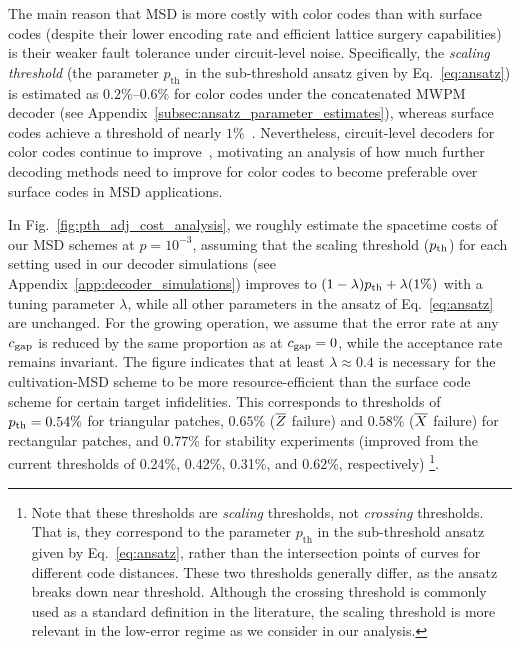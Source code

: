 \documentclass[
 prx,
 reprint,
 superscriptaddress,
 longbibliography,
 dvipsnames
]{revtex4-2}
\begin{document}
\label{para:themainreason}
The main reason that MSD is more costly with color codes than with surface codes (despite their lower encoding rate and efficient lattice surgery capabilities) is their weaker fault tolerance under circuit-level noise. 
Specifically, the \textit{scaling threshold} (the parameter $p_\mathrm{th}$ in the sub-threshold ansatz given by Eq.~\eqref{eq:ansatz}) is estimated as $0.2\%$–$0.6\%$ for color codes under the concatenated MWPM decoder (see Appendix~\ref{subsec:ansatz_parameter_estimates}), whereas surface codes achieve a threshold of nearly $1\%$~\cite{fowler2009high,stephens2014fault,heim2016optimal,higgot2023improved}.
Nevertheless, circuit-level decoders for color codes continue to improve~\cite{beverland2021cost,gidney2023new,lee2025color}, motivating an analysis of how much further decoding methods need to improve for color codes to become preferable over surface codes in MSD applications.

In Fig.~\ref{fig:pth_adj_cost_analysis}, we roughly estimate the spacetime costs of our MSD schemes at $p=10^{-3}$, assuming that the scaling threshold ($p_{\mathrm{th}}$) for each setting used in our decoder simulations (see Appendix~\ref{app:decoder_simulations}) improves to $(1 - \lambda) p_{\mathrm{th}} + \lambda(1\%)$ with a tuning parameter $\lambda$, while all other parameters in the ansatz of Eq.~\eqref{eq:ansatz} are unchanged.
For the growing operation, we assume that the error rate at any $c_{\mathrm{gap}}$ is reduced by the same proportion as at $c_{\mathrm{gap}}=0$, while the acceptance rate remains invariant.
The figure indicates that at least $\lambda \approx 0.4$ is necessary for the cultivation-MSD scheme to be more resource-efficient than the surface code scheme for certain target infidelities.
This corresponds to thresholds of $p_{\mathrm{th}} = 0.54\%$ for triangular patches, $0.65\%$ ($\overline{Z}$ failure) and $0.58\%$ ($\overline{X}$ failure) for rectangular patches, and $0.77\%$ for stability experiments (improved from the current thresholds of 0.24\%, 0.42\%, 0.31\%, and 0.62\%, respectively) \footnote{
    Note that these thresholds are \textit{scaling} thresholds, not \textit{crossing} thresholds.
    That is, they correspond to the parameter $p_\mathrm{th}$ in the sub-threshold ansatz given by Eq.~\eqref{eq:ansatz}, rather than the intersection points of curves for different code distances.
    These two thresholds generally differ, as the ansatz breaks down near threshold.
    Although the crossing threshold is commonly used as a standard definition in the literature, the scaling threshold is more relevant in the low-error regime as we consider in our analysis.
}.
\end{document}
